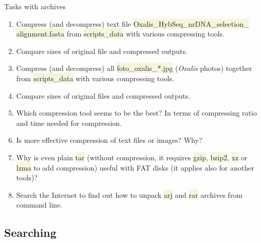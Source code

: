 \documentclass[compress, xelatex, 11pt, xcolor=svgnames, aspectratio=169,
	hyperref={
		bookmarks=true,
		unicode=true,
		colorlinks=true,
		pdftitle={Linux, command line and MetaCentrum},
		plainpages=false,
		pdfauthor={Vojtech Zeisek},
		pdfsubject={Course about use of Linux command line, writing shell scripts and using MetaCentrum of CESNET},
		pdfcreator={XeLaTeX},
		pdfkeywords={Linux, GNU, BASH, shell, command line, MetaCentrum},
		linkcolor=DarkRed, %
		anchorcolor=DarkBlue, %
		citecolor=Indigo, %
		filecolor=NavyBlue, %
		menucolor=DarkMagenta, %
		urlcolor=DarkBlue, %
		},
	url={hyphens, lowtilde} %
	]{beamer}
\renewcommand{\texttt}[1]{\colorbox{Beige}{{\ttfamily #1}}}
\begin{document}
\begin{frame}{Tasks with archives}
	\begin{enumerate}
		\item Compress (and decompress) text file \texttt{Oxalis\_HybSeq\_nrDNA\_selection\_} \texttt{alignment.fasta} from \texttt{scripts\_data} with various compressing tools.
		\item Compare sizes of original file and compressed outputs.
		\item Compress (and decompress) all \texttt{foto\_oxalis\_*.jpg} (\textit{Oxalis} photos) together from \texttt{scripts\_data} with various compressing tools.
		\item Compare sizes of original files and compressed outputs.
		\item Which compression tool seems to be the best? In terms of compressing ratio and time needed for compression.
		\item Is more effective compression of text files or images? Why?
		\item Why is even plain \texttt{tar} (without compression, it requires \texttt{gzip}, \texttt{bzip2}, \texttt{xz} or \texttt{lzma} to add compression) useful with FAT disks (it applies also for another tools)?
		\item Search the Internet to find out how to unpack \texttt{arj} and \texttt{rar} archives from command line.
	\end{enumerate}
\end{frame}

\subsection{Searching}
\end{document}
